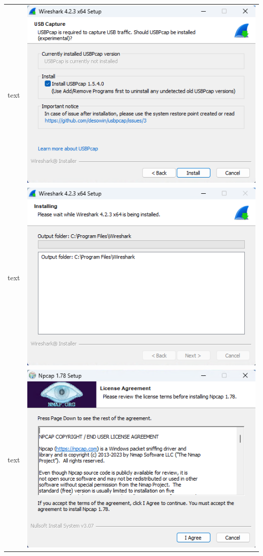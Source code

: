 \documentclass[11pt]{report}
\begin{document}
\begin{tabular}{ l r }
            text & \includegraphics[scale=1.0]{wireshark09} \\
            text & \includegraphics[scale=1.0]{wireshark10} \\
            text & \includegraphics[scale=1.0]{wireshark11} \\

\end{tabular}
\end{document}
